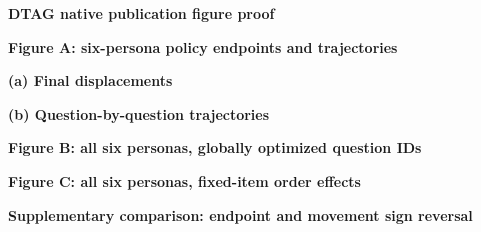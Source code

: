 \documentclass[10pt]{article}
\begin{document}
\begin{center}\Large\bfseries DTAG native publication figure proof\end{center}
\begin{center}\bfseries Figure A: six-persona policy endpoints and trajectories\end{center}
\begin{minipage}[t]{.487\textwidth}
\centering\vspace{0pt}
\footnotesize\textbf{(a) Final displacements}\par\vspace{1mm}

\end{minipage}\hfill
\begin{minipage}[t]{.487\textwidth}
\centering\vspace{0pt}
\footnotesize\textbf{(b) Question-by-question trajectories}\par\vspace{1mm}

\end{minipage}
\clearpage
\begin{center}\Large\bfseries Figure B: all six personas, globally optimized question IDs\end{center}
\vspace{1mm}\begin{center}\end{center}
\clearpage
\begin{center}\Large\bfseries Figure C: all six personas, fixed-item order effects\end{center}
\vspace{1mm}\begin{center}\end{center}
\clearpage
\begin{center}\Large\bfseries Supplementary comparison: endpoint and movement sign reversal\end{center}
\vspace{1mm}\begin{center}\end{center}
\end{document}
